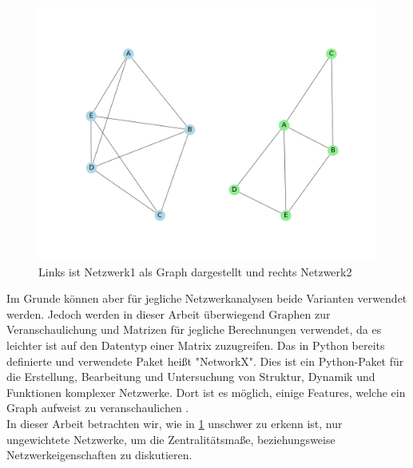 \begin{figure}[h!]
    \centering
    \hspace*{-4cm}
    \includegraphics[width=1.0\textwidth]{Graphics/MatrixInNetwork.png}
    \caption{Links ist Netzwerk1 als Graph dargestellt und rechts Netzwerk2}\label{fig:MatrixInNetzwerk}
\end{figure}

Im Grunde können aber für jegliche Netzwerkanalysen beide Varianten verwendet werden. Jedoch werden in dieser Arbeit überwiegend Graphen zur Veranschaulichung und Matrizen für jegliche Berechnungen verwendet, da es leichter ist auf den Datentyp einer Matrix zuzugreifen. Das in Python bereits definierte und verwendete Paket heißt "NetworkX". Dies ist ein Python-Paket für die Erstellung, Bearbeitung und Untersuchung von Struktur, Dynamik und Funktionen komplexer Netzwerke. Dort ist es möglich, einige Features, welche ein Graph aufweist zu veranschaulichen \cite{NetworkX}. \\
In dieser Arbeit betrachten wir, wie in \ref{fig:MatrixInNetzwerk} unschwer zu erkenn ist, nur
ungewichtete Netzwerke, um die Zentralitätsmaße, beziehungsweise Netzwerkeigenschaften zu diskutieren.

